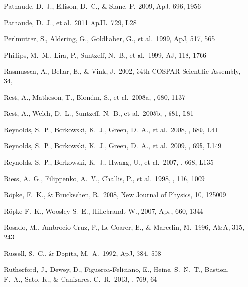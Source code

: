 \documentclass[11pt,a4paper]{article}
\begin{document}
{\begin{multicols}{2}
{\begin{thebibliography}{99}
 Patnaude, D.~J., Ellison,
  D.~C., \& Slane, P.\ 2009, ApJ, 696, 1956

 Patnaude, D.~J., et al.\ 2011
  ApJL, 729, L28

 Perlmutter, S.,
Aldering, G., Goldhaber, G., et al.\ 1999, ApJ, 517, 565

 Phillips, M.~M., Lira,
P., Suntzeff, N.~B., et al.\ 1999, AJ, 118, 1766 

 Rasmussen, A., Behar,
E., \& Vink, J.\ 2002, 34th COSPAR Scientific Assembly, 34, 

 Rest, A., Matheson, T., 
Blondin, S., et al.\ 2008a, \apj, 680, 1137 

 Rest, A., Welch, D.~L., 
Suntzeff, N.~B., et al.\ 2008b, \apj, 681, L81 

 Reynolds, S.~P.,
  Borkowski, K.~J., Green, D.~A., et al.\ 2008, \apj, 680, L41

 Reynolds, S.~P., 
Borkowski, K.~J., Green, D.~A., et al.\ 2009,  \apj, 695, L149 


 Reynolds, S.~P.,
  Borkowski, K.~J., Hwang, U., et al.\ 2007, \apj, 668, L135

 Riess, A.~G., Filippenko,
  A.~V., Challis, P., et al.\ 1998, \aj, 116, 1009

 R{\"o}pke, F.~K., \&
  Bruckschen, R.\ 2008, New Journal of Physics, 10, 125009

 R{\"o}pke F.~K.,
  Woosley S.~E., Hillebrandt W., 2007, ApJ, 660, 1344

 Rosado, M.,
  Ambrocio-Cruz, P., Le Coarer, E., \& Marcelin, M.\ 1996, A\&A, 315,
  243

 Russell, S.~C.,
\& Dopita, M.~A.\ 1992, ApJ, 384, 508

 Rutherford, J., Dewey,
  D., Figueroa-Feliciano, E., Heine, S.~N.~T., Bastien, F.~A., Sato,
  K., \& Canizares, C.~R.\ 2013, \apj, 769, 64


\end{thebibliography}}
\end{multicols}}
\end{document}
